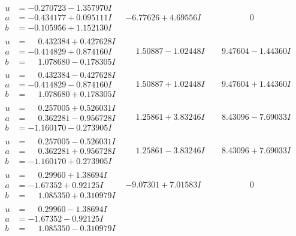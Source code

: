 \documentclass[1p]{elsarticle_modified}
\theoremstyle{definition}
\begin{document}
$$\begin{array}{c|c|c}
\begin{aligned}
u &= -0.270723 - 1.357970 I \\
a &= -0.434177 + 0.095111 I \\
b &= -0.105956 + 1.152130 I\end{aligned}
 & -6.77626 + 4.69556 I & \phantom{-0.000000 } 0 \\ \hline\begin{aligned}
u &= \phantom{-}0.432384 + 0.427628 I \\
a &= -0.414829 + 0.874160 I \\
b &= \phantom{-}1.078680 - 0.178305 I\end{aligned}
 & \phantom{-}1.50887 - 1.02448 I & \phantom{-}9.47604 - 1.44360 I \\ \hline\begin{aligned}
u &= \phantom{-}0.432384 - 0.427628 I \\
a &= -0.414829 - 0.874160 I \\
b &= \phantom{-}1.078680 + 0.178305 I\end{aligned}
 & \phantom{-}1.50887 + 1.02448 I & \phantom{-}9.47604 + 1.44360 I \\ \hline\begin{aligned}
u &= \phantom{-}0.257005 + 0.526031 I \\
a &= \phantom{-}0.362281 - 0.956728 I \\
b &= -1.160170 - 0.273905 I\end{aligned}
 & \phantom{-}1.25861 + 3.83246 I & \phantom{-}8.43096 - 7.69033 I \\ \hline\begin{aligned}
u &= \phantom{-}0.257005 - 0.526031 I \\
a &= \phantom{-}0.362281 + 0.956728 I \\
b &= -1.160170 + 0.273905 I\end{aligned}
 & \phantom{-}1.25861 - 3.83246 I & \phantom{-}8.43096 + 7.69033 I \\ \hline\begin{aligned}
u &= \phantom{-}0.29960 + 1.38694 I \\
a &= -1.67352 + 0.92125 I \\
b &= \phantom{-}1.085350 + 0.310979 I\end{aligned}
 & -9.07301 + 7.01583 I & \phantom{-0.000000 } 0 \\ \hline\begin{aligned}
u &= \phantom{-}0.29960 - 1.38694 I \\
a &= -1.67352 - 0.92125 I \\
b &= \phantom{-}1.085350 - 0.310979 I\end{aligned}

\end{array}$$
\end{document}
